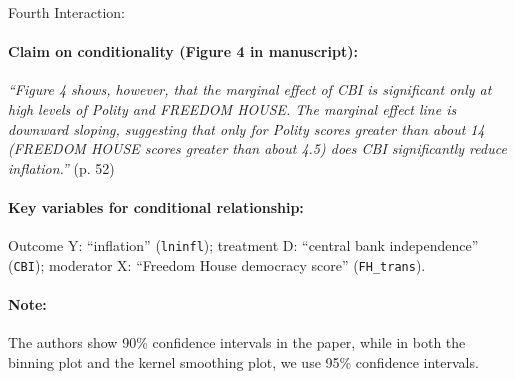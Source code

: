 \documentclass[12pt]{article}
\begin{document}
\clearpage
\noindent Fourth Interaction:

\paragraph{Claim on conditionality (Figure 4 in manuscript):}

\emph{``Figure 4 shows, however, that the marginal effect of CBI is
  significant only at high levels of Polity and FREEDOM HOUSE. The
  marginal effect line is downward sloping, suggesting that only for
  Polity scores greater than about 14 (FREEDOM HOUSE scores greater
  than about 4.5) does CBI significantly reduce inflation.''} (p. 52)

\paragraph{Key variables for conditional relationship:} Outcome Y:
``inflation'' (\texttt{lninfl}); treatment D: ``central bank
independence'' (\texttt{CBI}); moderator X:  ``Freedom
House democracy score'' (\texttt{FH\_trans}).

\paragraph{Note:} The authors show 90\% confidence intervals in the paper, while in both the binning plot and the kernel smoothing plot, we use 95\% confidence intervals.
\end{document}
